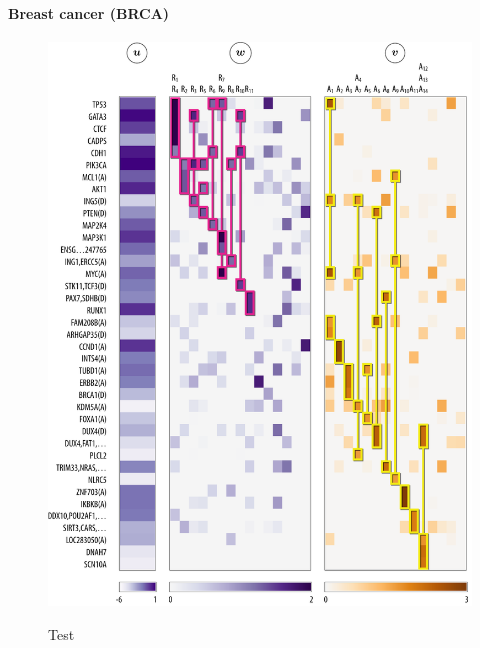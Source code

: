\paragraph{Breast cancer (BRCA)}

\begin{figure}[htb]
\centering
\includegraphics[width=\textwidth]{figures/genes/mat_brca.pdf}\\[2em]
\caption{Test}
\end{figure}

